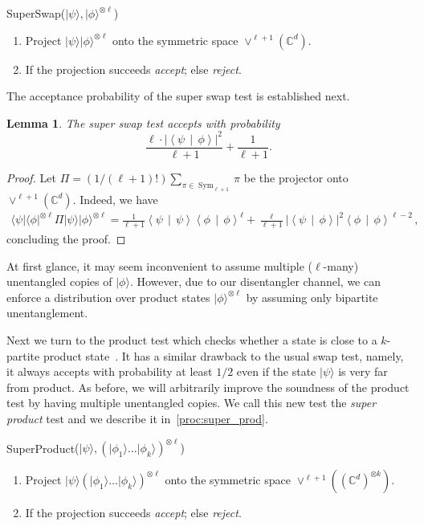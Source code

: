 \documentclass[10pt,a4paper]{article}
\newtheorem{lemma}[theorem]{Lemma}
\theoremstyle{remark}
\newcommand{\mcom}{\,,}
\newcommand{\C}{{\mathbb C}}
\newcommand{\abs}[1]{\ensuremath{\left\lvert #1 \right\rvert}}
\newcommand{\1}[1]{\mathds{1}{[#1]}}
\newcommand{\ket}[1]{\lvert #1\rangle}
\newcommand{\braket}[2]{\left\langle #1 \,\middle\vert\, #2\right\rangle}
\DeclareMathOperator{\Sym}{Sym}
\newcommand{\bra}[1]{\langle#1|}
\numberwithin{equation}{section}
\begin{document}
\begin{algorithm}{SuperSwap}{($\ket{\psi},\ket{\phi}^{\otimes \ell}$)}
     \begin{enumerate}
           \item Project $\ket{\psi}\ket{\phi}^{\otimes \ell}$ onto the symmetric space $\vee^{\ell+1}(\C^{d})$.
           \item If the projection succeeds \emph{accept};        
            else \emph{reject}.
     \end{enumerate}
     \caption{Super Swap Test}\label{proc:super_swap}
\end{algorithm}

The acceptance probability of the super swap test is established next.

\begin{lemma}\label{lem:super_swap}
  The super swap test accepts with probability 
  \[\frac{\ell \cdot \abs{\braket{\psi}{\phi}}^2}{\ell+1} + \frac{1}{\ell+1}.\]
\end{lemma}

\begin{proof}
  Let $\Pi = (1/(\ell+1)!) \sum_{\pi \in \Sym_{\ell+1}} \pi$ be the projector onto $\vee^{\ell+1}(\C^{d})$. Indeed, we have
  \begin{align*}
    \bra{\psi}\bra{\phi}^{\otimes \ell} \Pi \ket{\psi}\ket{\phi}^{\otimes \ell} = \frac{1}{\ell+1} \braket{\psi}{\psi} \braket{\phi}{\phi}^{\ell} + \frac{\ell}{\ell+1} \abs{\braket{\psi}{\phi}}^2 \braket{\phi}{\phi}^{\ell-2}\mcom
  \end{align*}
  concluding the proof.
\end{proof}

At first glance, it may seem inconvenient to assume multiple ($\ell$-many) unentangled copies of $\ket{\phi}$.
However, due to our disentangler channel, we can enforce a distribution over product states $\ket{\phi}^{\otimes \ell}$ by assuming
only bipartite unentanglement.

Next we turn to the product test which checks whether a state is close to a $k$-partite product state~\cite{HM13}.
It has a similar drawback to the usual swap test, namely, it always accepts with probability at least $1/2$
even if the state $\ket{\psi}$ is very far from product. As before, we will arbitrarily improve the soundness of the product test
by having multiple unentangled copies. We call this new test the \emph{super product} test and we describe it in~\cref{proc:super_prod}.

\begin{algorithm}{SuperProduct}{($\ket{\psi},(\ket{\phi_1}\ldots\ket{\phi_k})^{\otimes \ell}$)}
     \begin{enumerate}
           \item Project $\ket{\psi}(\ket{\phi_1}\ldots\ket{\phi_k})^{\otimes \ell}$ onto the symmetric space $\vee^{\ell+1}((\C^{d})^{\otimes k})$.
          \item If the projection succeeds \emph{accept};        
            else \emph{reject}.
     \end{enumerate}
     \caption{Super Product Test}\label{proc:super_prod}
\end{algorithm}
\end{document}
